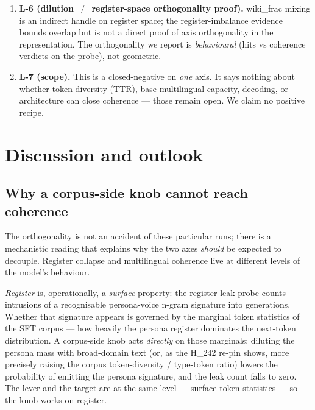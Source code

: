 \documentclass[11pt,a4paper]{article}
\begin{document}
\begin{enumerate}
  (wiki\_frac $0.0$, $0.3$) whose per-language integers \emph{are}
  persisted verbatim.
\item \textbf{L-6 (dilution $\neq$ register-space orthogonality proof).}
  wiki\_frac mixing is an indirect handle on register space; the
  register-imbalance evidence bounds overlap but is not a direct proof of
  axis orthogonality in the representation. The orthogonality we report is
  \emph{behavioural} (hits vs coherence verdicts on the probe), not
  geometric.
\item \textbf{L-7 (scope).} This is a closed-negative on \emph{one} axis.
  It says nothing about whether token-diversity (TTR), base multilingual
  capacity, decoding, or architecture can close coherence --- those remain
  open. We claim no positive recipe.
\end{enumerate}

\section{Discussion and outlook}
\label{sec:discussion}

\subsection{Why a corpus-side knob cannot reach coherence}

The orthogonality is not an accident of these particular runs; there is a
mechanistic reading that explains why the two axes \emph{should} be
expected to decouple. Register collapse and multilingual coherence live
at different levels of the model's behaviour.

\emph{Register} is, operationally, a \emph{surface} property: the
register-leak probe counts intrusions of a recognisable persona-voice
n-gram signature into generations. Whether that signature appears is
governed by the marginal token statistics of the SFT corpus --- how
heavily the persona register dominates the next-token distribution. A
corpus-side knob acts \emph{directly} on those marginals: diluting the
persona mass with broad-domain text (or, as the H\_242 re-pin shows, more
precisely raising the corpus token-diversity / type-token ratio) lowers
the probability of emitting the persona signature, and the leak count
falls to zero. The lever and the target are at the same level --- surface
token statistics --- so the knob works on register.
\end{document}
